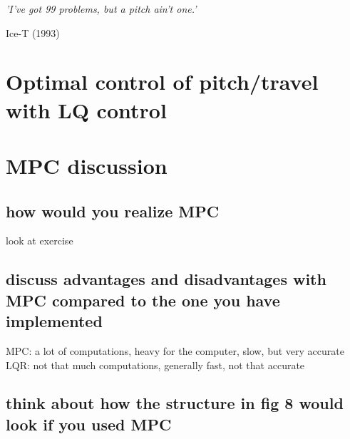 \epigraph{\textit{'I've got 99 problems, but a pitch ain't one.'}}{Ice-T (1993)}

\section{Optimal control of pitch/travel with LQ control}

\section{MPC discussion}

\subsection{how would you realize MPC}
look at exercise 

\subsection{discuss advantages and disadvantages with MPC compared to the one you have implemented}
MPC: a lot of computations, heavy for the computer, slow, but very accurate
LQR: not that much computations, generally fast, not that accurate

\subsection{think about how the structure in fig 8 would look if you used MPC}